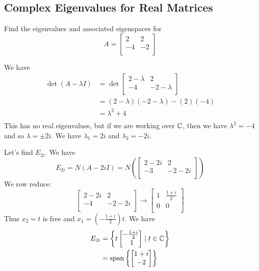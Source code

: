 \documentclass{article}
\DeclareMathOperator{\spn}{span}
\begin{document}
\subsection{Complex Eigenvalues for Real Matrices}
\begin{example}
  Find the eigenvalues and associated eigenspaces for \[
    A =
    \begin{bmatrix}
      2 & 2\\
      -4 & -2\\
    \end{bmatrix}
  \]

  We have
  \begin{align*}
    \det (A - \lambda I) &= \det
    \begin{bmatrix}
      2 - \lambda & 2\\
      -4 & -2-\lambda\\
    \end{bmatrix}\\
    &= (2-\lambda)(-2-\lambda) - (2)(-4)\\
    &= \lambda^2 + 4\\
  \end{align*}
  This has no real eigenvalues, but if we are working over $\mathbb{C}$, then we have $\lambda^2 = -4$ and so $\lambda = \pm 2i$.
  We have $\lambda_1 = 2i$ and $\lambda_2 = -2i$.

  Let's find $E_{2i}$. We have \[
    E_{2i} = N(A - 2iI) = N \left(
      \begin{bmatrix}
        2 -2i & 2\\
        -3 & -2 -2i\\
    \end{bmatrix}\right)
  \]
  We row reduce: \[
    \begin{bmatrix}
      2 - 2i & 2\\
      -4 & -2-2i\\
    \end{bmatrix} \to
    \begin{bmatrix}
      1 & \frac{1 + i}{2}\\
      0 & 0\\
    \end{bmatrix}
  \]
  Thus $x_2 = t$ is free and $x_1 = \left(-\frac{1+i}{2}\right)t$. We have
  \begin{align*}
    E_{2i} &= \left\{ t
      \begin{bmatrix}
        -\frac{1 + i}{2}\\\
        1\\
    \end{bmatrix}\mid t \in \C \right\}\\
    &= \spn \left\{
      \begin{bmatrix}
        1 + i\\
        -2\\
    \end{bmatrix}\right\}
  \end{align*}
\end{example}
\end{document}
